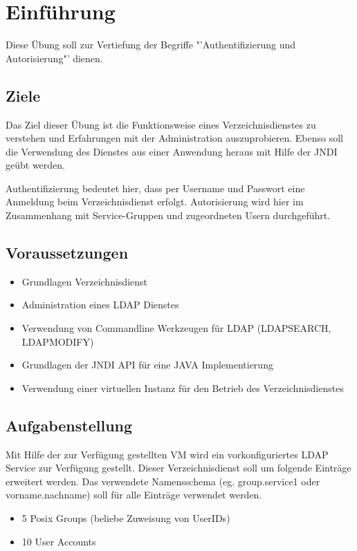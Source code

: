 
\section{Einführung}
Diese Übung soll zur Vertiefung der Begriffe "'Authentifizierung und Autorisierung"' dienen.

\subsection{Ziele}
Das Ziel dieser Übung ist die Funktionsweise eines Verzeichnisdienstes zu verstehen und Erfahrungen mit der Administration auszuprobieren. Ebenso soll die Verwendung des Dienstes aus einer Anwendung heraus mit Hilfe der JNDI geübt werden.

Authentifizierung bedeutet hier, dass per Username und Passwort eine Anmeldung beim Verzeichnisdienst erfolgt. Autorisierung wird hier im Zusammenhang mit Service-Gruppen und zugeordneten Usern durchgeführt.


\subsection{Voraussetzungen}
\begin{itemize}
\item Grundlagen Verzeichnisdienst
\item Administration eines LDAP Dienstes
\item Verwendung von Commandline Werkzeugen für LDAP (LDAPSEARCH, LDAPMODIFY)
\item Grundlagen der JNDI API für eine JAVA Implementierung
\item Verwendung einer virtuellen Instanz für den Betrieb des Verzeichnisdienstes
\end{itemize}


\subsection{Aufgabenstellung}
Mit Hilfe der zur Verfügung gestellten VM wird ein vorkonfiguriertes LDAP Service zur Verfügung gestellt. Dieser Verzeichnisdienst soll um folgende Einträge erweitert werden. Das verwendete Namensschema (eg. group.service1 oder vorname.nachname) soll für alle Einträge verwendet werden.

\begin{itemize}
\item 5 Posix Groups (beliebe Zuweisung von UserIDs)
\item 10 User Accounts
\end{itemize}

